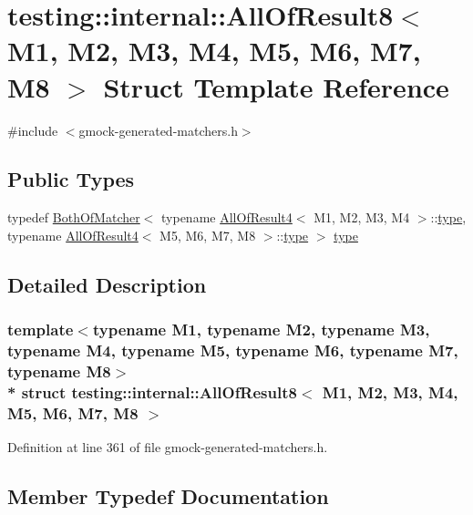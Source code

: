 \hypertarget{structtesting_1_1internal_1_1_all_of_result8}{}\section{testing\+:\+:internal\+:\+:All\+Of\+Result8$<$ M1, M2, M3, M4, M5, M6, M7, M8 $>$ Struct Template Reference}
\label{structtesting_1_1internal_1_1_all_of_result8}


{\ttfamily \#include $<$gmock-\/generated-\/matchers.\+h$>$}

\subsection*{Public Types}
\begin{DoxyCompactItemize}
\item 
typedef \hyperlink{classtesting_1_1internal_1_1_both_of_matcher}{Both\+Of\+Matcher}$<$ typename \hyperlink{structtesting_1_1internal_1_1_all_of_result4}{All\+Of\+Result4}$<$ M1, M2, M3, M4 $>$\+::\hyperlink{structtesting_1_1internal_1_1_all_of_result8_a7103892a28c35221b9e62e871c577727}{type}, typename \hyperlink{structtesting_1_1internal_1_1_all_of_result4}{All\+Of\+Result4}$<$ M5, M6, M7, M8 $>$\+::\hyperlink{structtesting_1_1internal_1_1_all_of_result8_a7103892a28c35221b9e62e871c577727}{type} $>$ \hyperlink{structtesting_1_1internal_1_1_all_of_result8_a7103892a28c35221b9e62e871c577727}{type}
\end{DoxyCompactItemize}


\subsection{Detailed Description}
\subsubsection*{template$<$typename M1, typename M2, typename M3, typename M4, typename M5, typename M6, typename M7, typename M8$>$\\*
struct testing\+::internal\+::\+All\+Of\+Result8$<$ M1, M2, M3, M4, M5, M6, M7, M8 $>$}



Definition at line 361 of file gmock-\/generated-\/matchers.\+h.



\subsection{Member Typedef Documentation}
